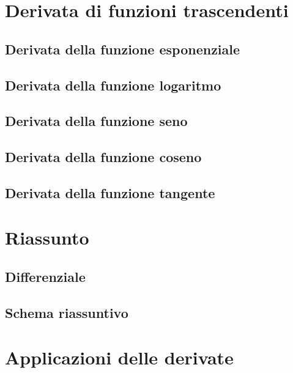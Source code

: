 \section{Derivata di funzioni trascendenti}
\label{sec:differenziazione_trascendenti}

\subsection{Derivata della funzione esponenziale}
\label{subsec:differenziazione_derivatafesponenziale}

\subsection{Derivata della funzione logaritmo}
\label{subsec:differenziazione_derivataflogaritmo}

\subsection{Derivata della funzione seno}
\label{subsec:differenziazione_derivatafseno}

\subsection{Derivata della funzione coseno}
\label{subsec:differenziazione_derivatafcoseno}

\subsection{Derivata della funzione tangente}
\label{subsec:differenziazione_derivataftangente}

\section{Riassunto}
\label{sec:differenziazione_sunto}

\subsection{Differenziale}
\label{subsec:differenziazione_differenziale}

\subsection{Schema riassuntivo}
\label{subsec:differenziazione_schemaderivate}

\section{Applicazioni delle derivate}
\label{sec:differenziazione_applicazioni}

